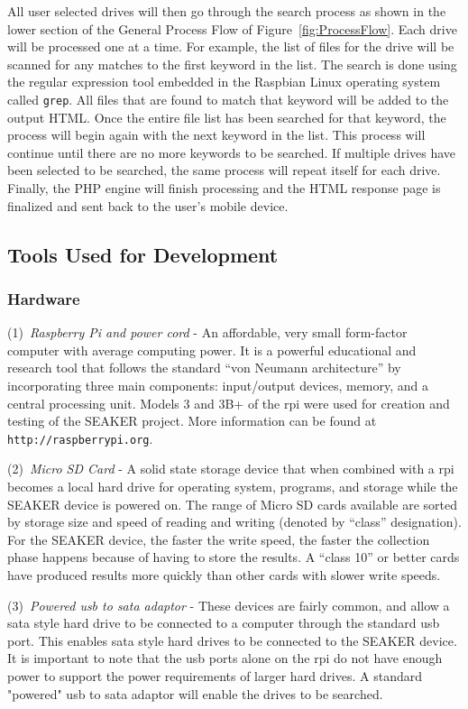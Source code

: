 \documentclass[12pt]{article}
\begin{document}
All user selected drives will then go through the search process as
shown in the lower section of the General Process Flow of
Figure~\ref{fig:ProcessFlow}. Each drive will be processed one at a
time. For example, the list of files for the drive will be scanned
for any matches to the first keyword in the list. The search is done
using the regular expression tool embedded in the Raspbian Linux
operating system called \verb|grep|. All files that are found to match
that keyword will be added to the output HTML. Once the entire file
list has been searched for that keyword, the process will begin again
with the next keyword in the list. This process will continue until
there are no more keywords to be searched. If multiple drives have
been selected to be searched, the same process will repeat itself
for each drive. Finally, the PHP engine will finish processing and
the HTML response page is finalized and sent back to the user's
mobile device.


\subsection{Tools Used for Development}

\subsubsection{Hardware}

(1)~{\em Raspberry Pi and power cord} - An affordable, very small
form-factor computer with average computing power. It is a powerful 
educational and research tool that follows the
standard ``von Neumann architecture'' by 
incorporating three main components: input/output devices, memory, and a 
central processing unit.  Models 3 and 3B+ of the \gls{rpi} were used
for creation and testing of the SEAKER project. More information can be
found at {\tt http://raspberrypi.org}.

(2)~{\em Micro SD Card} - A solid state storage device that when combined
with a \gls{rpi} becomes a local hard drive for operating system, programs,
and storage while the SEAKER device is powered on.  The range of Micro SD
cards available are sorted by storage size and speed of reading and writing
(denoted by ``class'' designation).  For
the SEAKER device, the faster the write speed, the faster the
collection phase happens because of having to store the results.
A ``class 10'' or better cards have produced results more quickly than
other cards with slower write speeds.

(3)~{\em Powered \gls{usb} to \gls{sata} adaptor} - These devices are fairly common, and
allow a \gls{sata} style hard drive to be connected to a computer through the
standard \gls{usb} port.  This enables \gls{sata} style hard drives to be connected
to the SEAKER device.  It is important to note that the \gls{usb} ports alone on the
\gls{rpi} do not have enough power to support the power requirements of larger hard
drives.  A standard "powered" \gls{usb} to \gls{sata} adaptor will enable the
drives to be searched.
\end{document}
